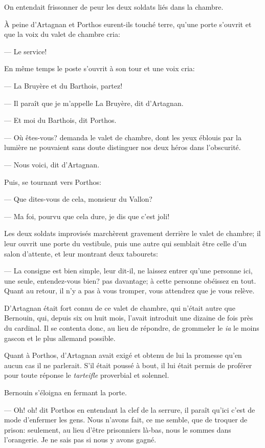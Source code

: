 On entendait frissonner de peur les deux soldats liés dans la chambre.

À peine d'Artagnan et Porthos eurent-ils touché terre, qu'une porte s'ouvrit et que la voix du valet de chambre cria:

— Le service!

En même temps le poste s'ouvrit à son tour et une voix cria:

— La Bruyère et du Barthois, partez!

— Il paraît que je m'appelle La Bruyère, dit d'Artagnan.

— Et moi du Barthois, dit Porthos.

— Où êtes-vous? demanda le valet de chambre, dont les yeux éblouis par la lumière ne pouvaient sans doute distinguer nos deux héros dans l'obscurité.

— Nous voici, dit d'Artagnan.

Puis, se tournant vers Porthos:

— Que dites-vous de cela, monsieur du Vallon?

— Ma foi, pourvu que cela dure, je dis que c'est joli!

Les deux soldats improvisés marchèrent gravement derrière le valet de chambre; il leur ouvrit une porte du vestibule, puis une autre qui semblait être celle d'un salon d'attente, et leur montrant deux tabourets:

— La consigne est bien simple, leur dit-il, ne laissez entrer qu'une personne ici, une seule, entendez-vous bien? pas davantage; à cette personne obéissez en tout. Quant au retour, il n'y a pas à vous tromper, vous attendrez que je vous relève.

D'Artagnan était fort connu de ce valet de chambre, qui n'était autre que Bernouin, qui, depuis six ou huit mois, l'avait introduit une dizaine de fois près du cardinal. Il se contenta donc, au lieu de répondre, de grommeler le \textit{ia} le moins gascon et le plus allemand possible.

Quant à Porthos, d'Artagnan avait exigé et obtenu de lui la promesse qu'en aucun cas il ne parlerait. S'il était poussé à bout, il lui était permis de proférer pour toute réponse le \textit{tarteifle} proverbial et solennel.

Bernouin s'éloigna en fermant la porte.

— Oh! oh! dit Porthos en entendant la clef de la serrure, il paraît qu'ici c'est de mode d'enfermer les gens. Nous n'avons fait, ce me semble, que de troquer de prison: seulement, au lieu d'être prisonniers là-bas, nous le sommes dans l'orangerie. Je ne sais pas si nous y avons gagné.

